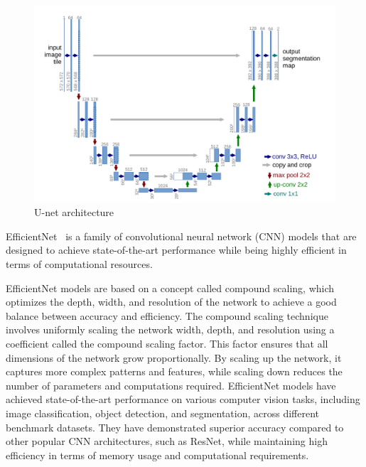 \documentclass[runningheads]{llncs}
\begin{document}
\begin{figure}[h!]
\centering
   \includegraphics[width=\linewidth]{imgs/U_Net.png}
\caption{U-net architecture%
}
\label{fig:unet}
\end{figure}

EfficientNet~\cite{EfficientNet} is a family of convolutional neural network (CNN) models that are designed to achieve state-of-the-art performance while being highly efficient in terms of computational resources.

EfficientNet models are based on a concept called compound scaling, which optimizes the depth, width, and resolution of the network to achieve a good balance between accuracy and efficiency.  The compound scaling technique involves uniformly scaling the network width, depth, and resolution using a coefficient called the compound scaling factor. This factor ensures that all dimensions of the network grow proportionally. By scaling up the network, it captures more complex patterns and features, while scaling down reduces the number of parameters and computations required. EfficientNet models have achieved state-of-the-art performance on various computer vision tasks, including image classification, object detection, and segmentation, across different benchmark datasets. They have demonstrated superior accuracy compared to other popular CNN architectures, such as ResNet, while maintaining high efficiency in terms of memory usage and computational requirements.
\end{document}
